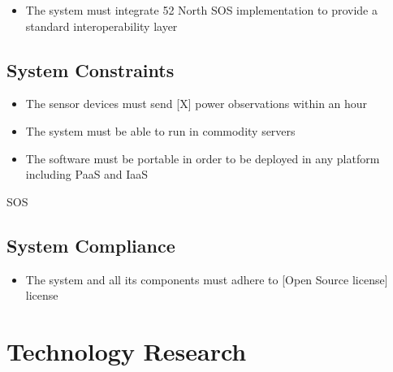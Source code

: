 \begin{itemize}
	\item The system must integrate 52 North SOS implementation to provide a standard interoperability layer
\end{itemize}

\subsection{System Constraints}

\begin{itemize}
	\item The sensor devices must send [X] power observations within an hour
	\item The system must be able to run in commodity servers 
	\item The software must be portable in order to be deployed in any platform including PaaS and IaaS
\end{itemize}

SOS

\subsection{System Compliance}

\begin{itemize}
	\item The system and all its components must adhere to [Open Source license] license
\end{itemize}


\section{Technology Research}
